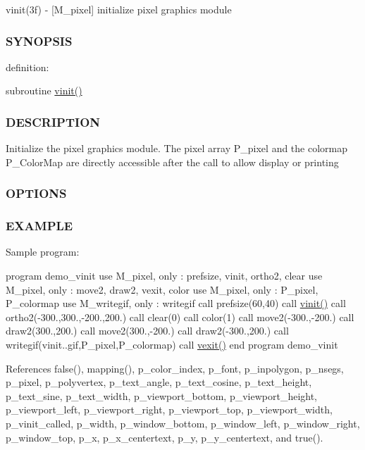 vinit(3f) -\/ \mbox{[}M\+\_\+pixel\mbox{]} initialize pixel graphics module 

\subsubsection*{S\+Y\+N\+O\+P\+S\+IS}

definition\+:

subroutine \hyperlink{namespacem__pixel_ac03ca8f23fdadb60599b6ea4dc87a6d9}{vinit()}

\subsubsection*{D\+E\+S\+C\+R\+I\+P\+T\+I\+ON}

Initialize the pixel graphics module. The pixel array P\+\_\+pixel and the colormap P\+\_\+\+Color\+Map are directly accessible after the call to allow display or printing

\subsubsection*{O\+P\+T\+I\+O\+NS}

\subsubsection*{E\+X\+A\+M\+P\+LE}

Sample program\+:

program demo\+\_\+vinit use M\+\_\+pixel, only \+: prefsize, vinit, ortho2, clear use M\+\_\+pixel, only \+: move2, draw2, vexit, color use M\+\_\+pixel, only \+: P\+\_\+pixel, P\+\_\+colormap use M\+\_\+writegif, only \+: writegif call prefsize(60,40) call \hyperlink{namespacem__pixel_ac03ca8f23fdadb60599b6ea4dc87a6d9}{vinit()} call ortho2(-\/300.,300.,-\/200.,200.) call clear(0) call color(1) call move2(-\/300.,-\/200.) call draw2(300.,200.) call move2(300.,-\/200.) call draw2(-\/300.,200.) call writegif(\textquotesingle{}vinit..\+gif\textquotesingle{},P\+\_\+pixel,P\+\_\+colormap) call \hyperlink{namespacem__pixel_a19ad6b65752322b0029a62cc0ebec3e8}{vexit()} end program demo\+\_\+vinit 

References false(), mapping(), p\+\_\+color\+\_\+index, p\+\_\+font, p\+\_\+inpolygon, p\+\_\+nsegs, p\+\_\+pixel, p\+\_\+polyvertex, p\+\_\+text\+\_\+angle, p\+\_\+text\+\_\+cosine, p\+\_\+text\+\_\+height, p\+\_\+text\+\_\+sine, p\+\_\+text\+\_\+width, p\+\_\+viewport\+\_\+bottom, p\+\_\+viewport\+\_\+height, p\+\_\+viewport\+\_\+left, p\+\_\+viewport\+\_\+right, p\+\_\+viewport\+\_\+top, p\+\_\+viewport\+\_\+width, p\+\_\+vinit\+\_\+called, p\+\_\+width, p\+\_\+window\+\_\+bottom, p\+\_\+window\+\_\+left, p\+\_\+window\+\_\+right, p\+\_\+window\+\_\+top, p\+\_\+x, p\+\_\+x\+\_\+centertext, p\+\_\+y, p\+\_\+y\+\_\+centertext, and true().

